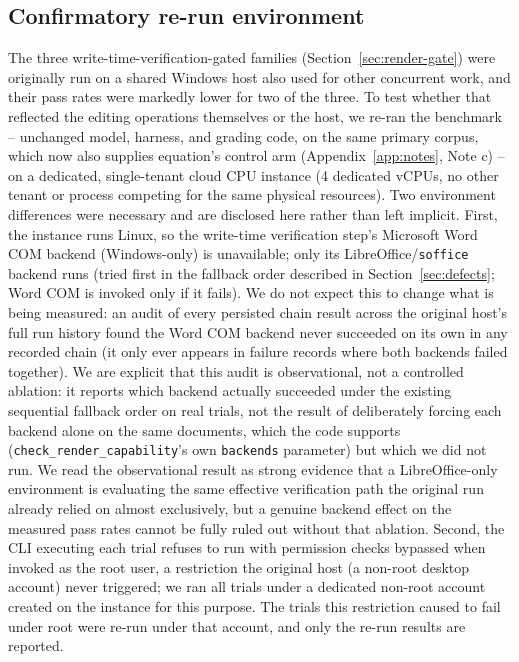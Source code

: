 \documentclass[11pt]{article}
\DeclareRobustCommand{\claim}[2]{#2}
\begin{document}
\subsection{Confirmatory re-run environment}
\label{sec:methods-rerun}
\claim{original-host-two-of-three-depressed}{\claim{verification-confound-reliability-cost}{The three write-time-verification-gated families (Section~\ref{sec:render-gate}) were originally
run on a shared Windows host also used for other concurrent work, and their pass rates were
markedly lower for two of the three.}} \claim{rerun-is-direct-test}{To test whether that reflected the editing operations
themselves or the host, we re-ran the benchmark} -- unchanged model, harness, and grading code,
on the same primary corpus, which now also supplies equation's control arm
(Appendix~\ref{app:notes}, Note c) -- on a dedicated, single-tenant cloud CPU instance (4 dedicated vCPUs, no other
tenant or process competing for the same physical resources). \claim{rerun-identical-benchmark-dedicated-host}{Two environment differences were
necessary and are disclosed here rather than left implicit.} First, the instance runs Linux, so
the write-time verification step's Microsoft Word COM backend (Windows-only) is unavailable; only
\claim{sequential-backend-fallback-order}{its LibreOffice/\texttt{soffice} backend runs (\claim{concurrent-fallback-fix-never-shipped}{tried first in the fallback order described in
Section~\ref{sec:defects}; Word COM is invoked only if it fails}).} \claim{backend-choice-no-effect-on-outcome}{We do not expect this to change what is
being measured: an audit of every persisted chain result across the original host's full run
history found the Word COM backend never succeeded on its own in any recorded chain} (it only
ever appears in failure records where both backends failed together). We are explicit that this
audit is observational, not a controlled ablation: \claim{sequential-backend-fallback-order}{\claim{concurrent-fallback-fix-never-shipped}{it reports which backend actually succeeded
under the existing sequential fallback order on real trials},} not the result of deliberately
forcing each backend alone on the same documents, which the code supports
(\texttt{check\_render\_capability}'s own \texttt{backends} parameter) but which we did not run.
\claim{backend-choice-no-effect-on-outcome}{\claim{rerun-is-direct-test}{We read the observational result as strong evidence that a LibreOffice-only environment is
evaluating the same effective verification path the original run already relied on almost
exclusively, but a genuine backend effect on the measured pass rates cannot be fully ruled out
without that ablation.}} \claim{rerun-nonroot-account}{Second, the CLI executing each trial
refuses to run with permission checks bypassed when invoked as the root user, a restriction the
original host (a non-root desktop account) never triggered; we ran all trials under a dedicated
non-root account created on the instance for this purpose. The trials this restriction caused to
fail under root were re-run under that account, and only the re-run results are reported.}
\end{document}
